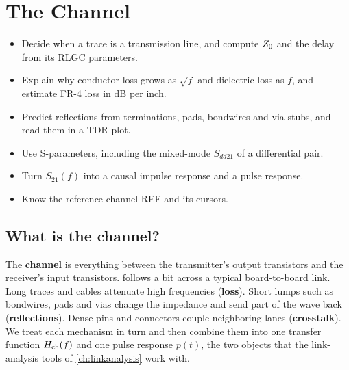 \chapter{The Channel}\label{ch:channel}
\providecommand{\chThreeOhm}{\ensuremath{\Omega}}

\begin{objectives}
\begin{itemize}
  \item Decide when a trace is a transmission line, and compute $Z_0$ and the delay from its RLGC parameters.
  \item Explain why conductor loss grows as $\sqrt f$ and dielectric loss as $f$, and estimate FR-4 loss in dB per inch.
  \item Predict reflections from terminations, pads, bondwires and via stubs, and read them in a TDR plot.
  \item Use S-parameters, including the mixed-mode $S_{dd21}$ of a differential pair.
  \item Turn $S_{21}(f)$ into a causal impulse response and a pulse response.
  \item Know the \OS{} reference channel REF and its cursors.
\end{itemize}
\end{objectives}

\section{What is the channel?}\label{sec:ch3-what}

The \textbf{channel} is everything between the transmitter's output transistors and the receiver's input transistors.  follows a bit across a typical board-to-board link. Long traces and cables attenuate high frequencies (\textbf{loss}). Short lumps such as bondwires, pads and vias change the impedance and send part of the wave back (\textbf{reflections}). Dense pins and connectors couple neighboring lanes (\textbf{crosstalk}). We treat each mechanism in turn and then combine them into one transfer function $H_\mathrm{ch}(f)$ and one pulse response $p(t)$, the two objects that the link-analysis tools of \cref{ch:linkanalysis} work with.

